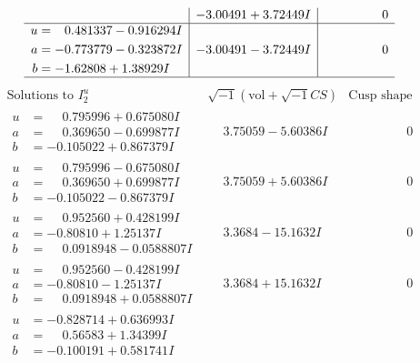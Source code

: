 \documentclass[1p]{elsarticle_modified}
\theoremstyle{definition}
\newcommand{\I}{\sqrt{-1}}
\begin{document}
$$\begin{array}{c|c|c}
 & -3.00491 + 3.72449 I & \phantom{-0.000000 } 0 \\ \hline\begin{aligned}
u &= \phantom{-}0.481337 - 0.916294 I \\
a &= -0.773779 - 0.323872 I \\
b &= -1.62808 + 1.38929 I\end{aligned}
 & -3.00491 - 3.72449 I & \phantom{-0.000000 } 0\\
 \hline 
 \end{array}$$\newpage$$\begin{array}{c|c|c}  
\text{Solutions to }I^u_{2}& \I (\text{vol} + \sqrt{-1}CS) & \text{Cusp shape}\\
 \hline 
\begin{aligned}
u &= \phantom{-}0.795996 + 0.675080 I \\
a &= \phantom{-}0.369650 - 0.699877 I \\
b &= -0.105022 + 0.867379 I\end{aligned}
 & \phantom{-}3.75059 - 5.60386 I & \phantom{-0.000000 } 0 \\ \hline\begin{aligned}
u &= \phantom{-}0.795996 - 0.675080 I \\
a &= \phantom{-}0.369650 + 0.699877 I \\
b &= -0.105022 - 0.867379 I\end{aligned}
 & \phantom{-}3.75059 + 5.60386 I & \phantom{-0.000000 } 0 \\ \hline\begin{aligned}
u &= \phantom{-}0.952560 + 0.428199 I \\
a &= -0.80810 + 1.25137 I \\
b &= \phantom{-}0.0918948 - 0.0588807 I\end{aligned}
 & \phantom{-}3.3684 - 15.1632 I & \phantom{-0.000000 } 0 \\ \hline\begin{aligned}
u &= \phantom{-}0.952560 - 0.428199 I \\
a &= -0.80810 - 1.25137 I \\
b &= \phantom{-}0.0918948 + 0.0588807 I\end{aligned}
 & \phantom{-}3.3684 + 15.1632 I & \phantom{-0.000000 } 0 \\ \hline\begin{aligned}
u &= -0.828714 + 0.636993 I \\
a &= \phantom{-}0.56583 + 1.34399 I \\
b &= -0.100191 + 0.581741 I\end{aligned}

\end{array}$$
\end{document}
